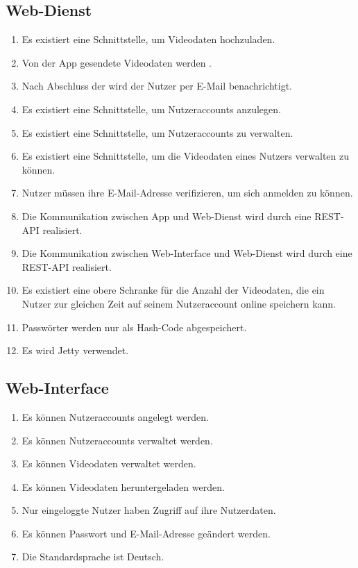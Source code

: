 \subsection{Web-Dienst}
	\begin{enumerate}
	\renewcommand{\labelenumi}{\textbf{\theenumi}}
	\renewcommand{\theenumi}{PK\arabic{enumi}0}
	\setcounter{enumi}{199}
	\item Es existiert eine Schnittstelle, um Videodaten hochzuladen.
	\item Von der \gls{App} gesendete Videodaten werden .
	\item Nach Abschluss der  wird der Nutzer per \gls{E-Mail} benachrichtigt.
	\item Es existiert eine Schnittstelle, um Nutzeraccounts anzulegen.
	\item Es existiert eine Schnittstelle, um Nutzeraccounts zu verwalten.
	\item Es existiert eine Schnittstelle, um die Videodaten eines Nutzers verwalten zu können.
	\item Nutzer müssen ihre \gls{E-Mail}-Adresse verifizieren, um sich anmelden zu können.
	\item Die Kommunikation zwischen App und Web-Dienst wird durch eine REST-\gls{API} realisiert.
	\item Die Kommunikation zwischen \gls{Web-Interface} und \gls{Web-Dienst} wird durch eine REST-\gls{API} realisiert.
	\item Es existiert eine obere Schranke für die Anzahl der Videodaten, die ein Nutzer zur gleichen Zeit auf seinem Nutzeraccount online speichern kann.
	\item Passwörter werden nur als \gls{Hash-Code} abgespeichert.
	\item Es wird Jetty verwendet.
	\end{enumerate}
\subsection{Web-Interface}
	\begin{enumerate}
	\renewcommand{\labelenumi}{\textbf{\theenumi}}
	\renewcommand{\theenumi}{PK\arabic{enumi}0}
	\setcounter{enumi}{299}
	\item Es können Nutzeraccounts angelegt werden.
	\item Es können Nutzeraccounts verwaltet werden.
	\item Es können Videodaten verwaltet werden.
	\item Es können Videodaten heruntergeladen werden.
	\item Nur eingeloggte Nutzer haben Zugriff auf ihre Nutzerdaten.
	\item Es können Passwort und \gls{E-Mail}-Adresse geändert werden.
	\item Die Standardsprache ist Deutsch.
	\end{enumerate}

